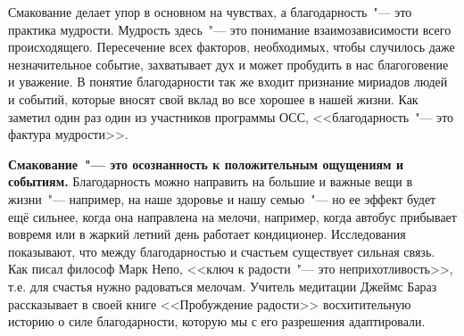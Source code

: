 Смакование делает упор в основном на чувствах, а благодарность~"--- это практика мудрости. Мудрость здесь~"--- это понимание взаимозависимости всего происходящего. Пересечение всех факторов, необходимых, чтобы случилось даже незначительное событие, захватывает дух и может пробудить в нас благоговение и уважение. В понятие благодарности так же входит признание мириадов людей и событий, которые вносят свой вклад во все хорошее в нашей жизни. Как заметил один раз один из участников программы ОСС, <<благодарность~"--- это фактура мудрости>>.

\textbf{Смакование~"--- это осознанность к положительным ощущениям и событиям.} Благодарность можно направить на большие и важные вещи в жизни~"--- например, на наше здоровье и нашу семью~"--- но ее эффект будет ещё сильнее, когда она направлена на мелочи, например, когда автобус прибывает вовремя или в жаркий летний день работает кондиционер. Исследования показывают, что между благодарностью и счастьем существует сильная связь\cite{123}. Как писал философ Марк Непо, <<ключ к радости~"--- это неприхотливость>>, т.е. для счастья нужно радоваться мелочам\cite{124}. Учитель медитации Джеймс Бараз рассказывает в своей книге <<Пробуждение радости>> восхитительную историю о силе благодарности, которую мы с его разрешения адаптировали\cite{125}.

